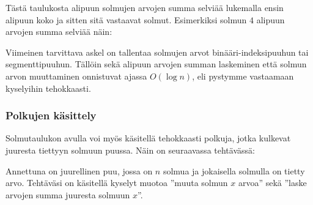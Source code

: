 Tästä taulukosta alipuun solmujen arvojen summa selviää
lukemalla ensin alipuun koko ja sitten sitä vastaavat solmut.
Esimerkiksi solmun $4$ alipuun arvojen summa selviää näin:

\begin{center}
\end{center}

Viimeinen tarvittava askel on tallentaa solmujen arvot
binääri-indeksi\-puuhun tai segmenttipuuhun.
Tällöin sekä alipuun arvojen summan laskeminen
että solmun arvon muuttaminen onnistuvat ajassa $O(\log n)$,
eli pystymme vastaamaan kyselyihin tehokkaasti.

\subsubsection{Polkujen käsittely}

Solmutaulukon avulla voi myös käsitellä tehokkaasti
polkuja, jotka kulkevat juuresta tiettyyn solmuun puussa.
Näin on seuraavassa tehtävässä:

\begin{task}
Annettuna on juurellinen puu, jossa on $n$ solmua
ja jokaisella solmulla on tietty arvo.
Tehtäväsi on käsitellä kyselyt muotoa
''muuta solmun $x$ arvoa'' sekä
''laske arvojen summa juuresta solmuun $x$''.
\end{task}

